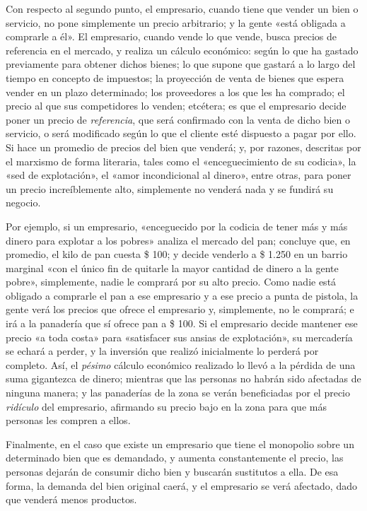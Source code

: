 \documentclass[12pt,a4paper,twoside]{book}
\begin{document}
Con respecto al segundo punto, el empresario, cuando tiene que vender un bien o servicio, no pone simplemente un precio arbitrario; y la gente «está obligada a comprarle a él». El empresario, cuando vende lo que vende, busca precios de referencia en el mercado, y realiza un cálculo económico: según lo que ha gastado previamente para obtener dichos bienes; lo que supone que gastará a lo largo del tiempo en concepto de impuestos; la proyección de venta de bienes que espera vender en un plazo determinado; los proveedores a los que les ha comprado; el precio al que sus competidores lo venden; etcétera; es que el empresario decide poner un precio de \textit{referencia}, que será confirmado con la venta de dicho bien o servicio, o será modificado según lo que el cliente esté dispuesto a pagar por ello. Si hace un promedio de precios del bien que venderá; y, por razones, descritas por el marxismo de forma literaria, tales como el «enceguecimiento de su codicia», la «sed de explotación», el «amor incondicional al dinero», entre otras, para poner un precio increíblemente alto, simplemente no venderá nada y se fundirá su negocio.

Por ejemplo, si un empresario, «enceguecido por la codicia de tener más y más dinero para explotar a los pobres» analiza el mercado del pan; concluye que, en promedio, el kilo de pan cuesta \$ 100; y decide venderlo a \$ 1.250 en un barrio marginal «con el único fin de quitarle la mayor cantidad de dinero a la gente pobre», simplemente, nadie le comprará por su alto precio. Como nadie está obligado a comprarle el pan a ese empresario y a ese precio a punta de pistola, la gente verá los precios que ofrece el empresario y, simplemente, no le comprará; e irá a la panadería que sí ofrece pan a \$ 100. Si el empresario decide mantener ese precio «a toda costa» para «satisfacer sus ansias de explotación», su mercadería se echará a perder, y la inversión que realizó inicialmente lo perderá por completo. Así, el \textit{pésimo} cálculo económico realizado lo llevó a la pérdida de una suma gigantezca de dinero; mientras que las personas no habrán sido afectadas de ninguna manera; y las panaderías de la zona se verán beneficiadas por el precio \textit{ridículo} del empresario, afirmando su precio bajo en la zona para que más personas les compren a ellos.

Finalmente, en el caso que existe un empresario que tiene el monopolio sobre un determinado bien que es demandado, y aumenta constantemente el precio, las personas dejarán de consumir dicho bien y buscarán sustitutos a ella. De esa forma, la demanda del bien original caerá, y el empresario se verá afectado, dado que venderá menos productos.
\end{document}
